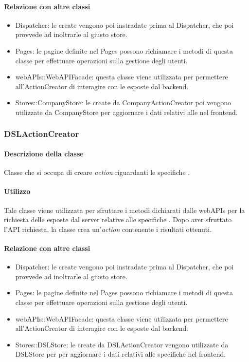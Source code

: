 \paragraph*{Relazione con altre classi}
\begin{itemize}
\item Dispatcher: le  create vengono poi instradate prima al Dispatcher, che poi provvede ad inoltrarle al giusto store.
\item Pages: le pagine definite nel  Pages possono richiamare i metodi di questa classe per effettuare operazioni sulla gestione degli utenti.
\item webAPIs::WebAPIFacade: questa classe viene utilizzata per permettere all'ActionCreator di interagire con le  esposte dal backend.
\item Stores::CompanyStore: le  create da CompanyActionCreator poi vengono utilizzate da CompanyStore per aggiornare i dati relativi alle  nel frontend.
\end{itemize}

\subsubsection{DSLActionCreator}
\paragraph*{Descrizione della classe}
Classe che si occupa di creare \textit{action} riguardanti le specifiche .
\paragraph*{Utilizzo}
Tale classe viene utilizzata per sfruttare i metodi dichiarati dalle webAPIs per la richiesta delle  esposte dal server relative alle specifiche . Dopo aver sfruttato l'API richiesta, la classe crea un'\textit{action} contenente i risultati ottenuti.

\paragraph*{Relazione con altre classi}
\begin{itemize}
\item Dispatcher: le  create vengono poi instradate prima al Dispatcher, che poi provvede ad inoltrarle al giusto store.
\item Pages: le pagine definite nel  Pages possono richiamare i metodi di questa classe per effettuare operazioni sulla gestione degli utenti.
\item webAPIs::WebAPIFacade: questa classe viene utilizzata per permettere all'ActionCreator di interagire con le  esposte dal backend.
\item Stores::DSLStore: le  create da DSLActionCreator vengono utilizzate da DSLStore per per aggiornare i dati relativi alle specifiche  nel frontend.
\end{itemize}

